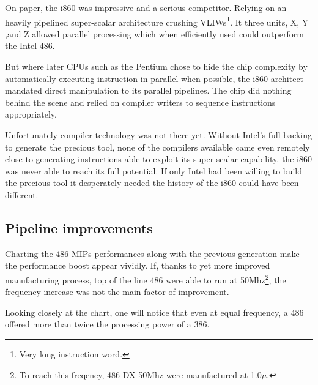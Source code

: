 \bigskip
\par
On paper, the i860 was impressive and a serious competitor. Relying on an heavily pipelined super-scalar architecture crushing VLIWs\footnote{Very long instruction word.}. It three units, X, Y ,and Z allowed parallel processing which when efficiently used could outperform the Intel 486.\\
\par
But where later CPUs such as the Pentium chose to hide the chip complexity by automatically executing instruction in parallel when possible, the i860 architect mandated direct manipulation to its parallel pipelines. The chip did nothing behind the scene and relied on compiler writers to sequence instructions appropriately.\\
\par
Unfortunately compiler technology was not there yet. Without Intel's full backing to generate the precious tool, none of the compilers available came even remotely close to generating instructions able to exploit its super scalar capability. the i860 was never able to reach its full potential. If only Intel had been willing to build the precious tool it desperately needed the history of the i860 could have been different.\\
\par
\par
{}
\par
{}

\par
\subsection{Pipeline improvements}
Charting the 486 MIPs performances along with the previous generation make the performance boost appear vividly. If, thanks to yet more improved manufacturing process, top of the line 486 were able to run at 50Mhz\footnote{To reach this freqency, 486 DX 50Mhz were manufactured at 1.0$\mu$.}, the frequency increase was not the main factor of improvement.\\
\par
 Looking closely at the chart, one will notice that even at equal frequency, a 486 offered more than twice the processing power of a 386.\\

